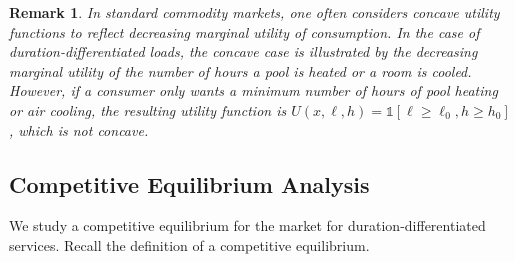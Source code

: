 \documentclass[10pt,draftcls,onecolumn]{IEEEtran}
\newtheorem{remark}{Remark}
\def\ind{{\mathds{1}}}
\newcounter{l1}
\newcounter{l2}
\newcounter{l3}
\begin{document}
\begin{remark}{\rm 
In standard commodity markets, one often considers concave utility functions to reflect decreasing marginal utility of consumption. In the case of duration-differentiated loads, the concave case is illustrated by the decreasing marginal utility  of the number of hours a pool is heated or a room is cooled.  However,
if a consumer only wants a minimum number of hours of pool heating or air cooling, the resulting utility function is
$U(x, \ell, h) = \ind [\ell \ge \ell_0, h \ge h_0]$, which  is not concave.}
\end{remark}


\subsection{Competitive Equilibrium Analysis}
We study a competitive equilibrium for the market for duration-differentiated services.   Recall the definition of a competitive equilibrium.
\end{document}
